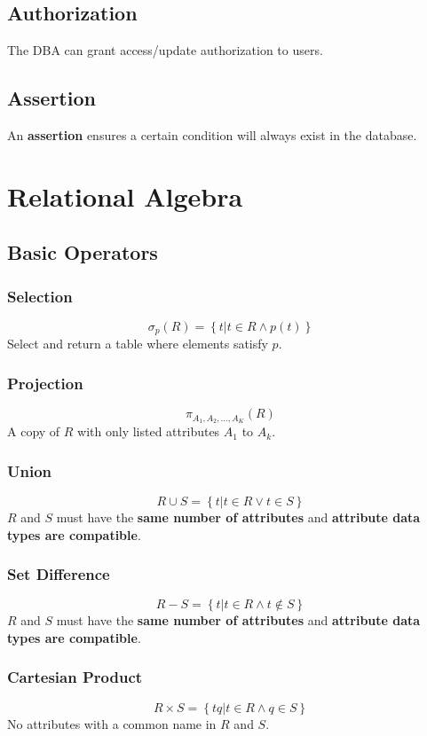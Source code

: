 \documentclass[11pt,a4paper]{article}
\begin{document}
\subsection{Authorization}
The DBA can grant access/update authorization to users.

\subsection{Assertion}
An \textbf{assertion} ensures a certain condition will always exist in the database. \par

\section{Relational Algebra}
\subsection{Basic Operators}
\subsubsection{Selection}
\[
\sigma_p(R) = \left\{t | t \in R \land p(t) \right\}
\]
Select and return a table where elements satisfy $p$.

\subsubsection{Projection}
\[
\pi_{A_1, A_2, \dots, A_K}(R)
\]
A copy of $R$ with only listed attributes $A_1$ to $A_k$.

\subsubsection{Union}
\[
R \cup S = \left\{t | t \in R \lor t \in S \right\}
\]
$R$ and $S$ must have the \textbf{same number of attributes} and \textbf{attribute data types are compatible}.

\subsubsection{Set Difference}
\[
R - S = \left\{t | t \in R \land t \notin S \right\}
\]
$R$ and $S$ must have the \textbf{same number of attributes} and \textbf{attribute data types are compatible}.

\subsubsection{Cartesian Product}
\[
R \times S = \left\{tq | t \in R \land q \in S \right\}
\]
No attributes with a common name in $R$ and $S$.
\end{document}
